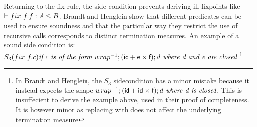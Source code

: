 \documentclass[a4paper,UKenglish,cleveref, autoref, thm-restate]{lipics-v2021}
\begin{document}
Returning to the fix-rule, the side condition prevents deriving ill-fixpoints like $\contains{}{\fix ~ f.f}{A}{B}$. Brandt and Henglein show that different predicates can be used to ensure soundness and that the particular way they restrict the use of recursive calls corresponds to distinct termination measures. An example of a sound side condition is:\\
$S_3(\fix ~f.c) \textit{if c is of the form } \dslcominv{wrap};(\dslcom{id}+\dslcom{e} \times \dslcom{f});d \textit{ where d and e are closed}$ \footnote{In Brandt and Henglein, the $S_3$ sidecondition has a minor mistake because it instead expects the shape $\dslcominv{wrap};(\dslcom{id}+\dslcom{id} \times \dslcom{f});d \textit{ where d is closed}$. This is insuffecient to derive the example above, used in their proof of completeness. It is however minor as replacing  with  does not affect the underlying termination measure}
\end{document}
